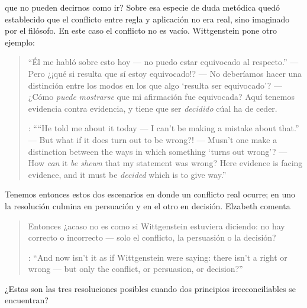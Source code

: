 que no pueden decirnos como ir? Sobre esa especie de duda metódica quedó establecido que el conflicto entre regla y aplicación no era real, sino imaginado por el filósofo. En este caso el conflicto no es vacío. Wittgenstein pone otro ejemplo: \blockquote[{\cite[\S641]{wittgenstein1969oncert}}: \enquote{``He told me about it today --- I can't be making a mistake about that.'' --- But what if it does turn out to be wrong?! --- Musn't one make a distinction between the ways in which something `turns out wrong'? --- How \emph{can} it \emph{be shewn} that my statement was wrong? Here evidence is facing evidence, and it must be \emph{decided} which is to give way.}]{``Él me habló sobre esto hoy --- no puedo estar equivocado al respecto.'' --- Pero ¿¡qué si resulta que sí estoy equivocado!? --- No deberíamos hacer una distinción entre los modos en los que algo `resulta ser equivocado'? --- ¿Cómo \emph{puede} \emph{mostrarse} que mi afirmación fue equivocada? Aquí tenemos evidencia contra evidencia, y tiene que ser \emph{decidido} cúal ha de ceder.}

Tenemos entonces estos dos escenarios en donde un conflicto real ocurre; en uno la resolución culmina en persuación y en el otro en decisión. Elzabeth comenta \blockquote[{\cite{anscombe1981parmenides:qli}}: \enquote{And now isn't it as if Wittgenstein were saying: there isn't a right or wrong --- but only the conflict, or persuasion, or decision?}]{Entonces ¿acaso no es como si Wittgenstein estuviera diciendo: no hay correcto o incorrecto --- solo el conflicto, la persuasión o la decisión?} ¿Estas son las tres resoluciones posibles cuando dos principios irecconciliables se encuentran?

